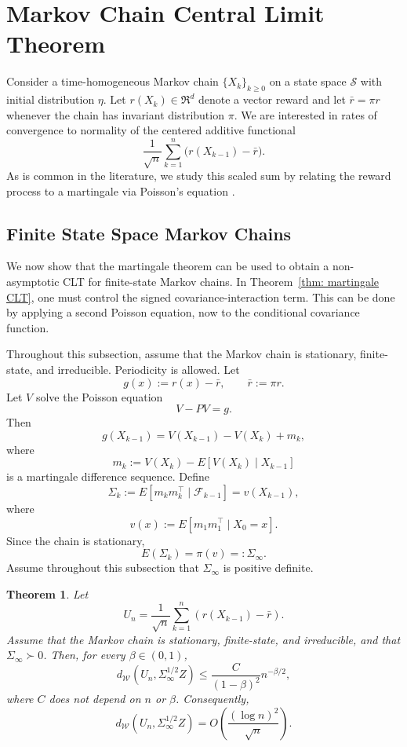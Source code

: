 \documentclass[10pt,a4paper]{article}
\newtheorem{theorem}{Theorem}
\begin{document}
\section{Markov Chain Central Limit Theorem}\label{sec: Markov}
Consider a time-homogeneous Markov chain $\{X_k\}_{k\geq 0}$ on a state space $\mathcal{S}$ with initial distribution $\eta$. Let $r(X_k)\in\Re^d$ denote a vector reward and let $\bar r=\pi r$ whenever the chain has invariant distribution $\pi$. We are interested in rates of convergence to normality of the centered additive functional
\[
    \frac{1}{\sqrt n}\sum_{k=1}^n\bigl(r(X_{k-1})-\bar r\bigr).
\]
As is common in the literature, we study this scaled sum by relating the reward process to a martingale via Poisson's equation \citep{douc2018markov,makowski2002poisson,glynn1996liapounov,glynn2023solution}.

\subsection{Finite State Space Markov Chains}
\label{subsec: finite_state_MC_corrected}

We now show that the martingale theorem can be used to obtain a
non-asymptotic CLT for finite-state Markov chains.  In Theorem~\ref{thm: martingale CLT}, one must control
the signed covariance-interaction term.  This can
be done by applying a second Poisson equation, now to the conditional
covariance function.

Throughout this subsection, assume that the Markov chain is stationary,
finite-state, and irreducible.  Periodicity is allowed.  Let
\[
    g(x):=r(x)-\bar r,
    \qquad
    \bar r:=\pi r.
\]
Let \(V\) solve the Poisson equation
\[
    V-PV=g.
\]
Then
\[
    g(X_{k-1})
    =
    V(X_{k-1})-V(X_k)+m_k,
\]
where
\[
    m_k:=V(X_k)-E[V(X_k)\mid X_{k-1}]
\]
is a martingale difference sequence.  Define
\[
    \Sigma_k:=E[m_km_k^\top\mid \mathcal F_{k-1}]
    =
    v(X_{k-1}),
\]
where
\[
    v(x):=E[m_1m_1^\top\mid X_0=x].
\]
Since the chain is stationary,
\[
    E(\Sigma_k)=\pi(v)=:\Sigma_\infty.
\]
Assume throughout this subsection that \(\Sigma_\infty\) is positive definite.

\begin{theorem}\label{thm: MC CLT}
Let
\[
U_n=\frac1{\sqrt n}\sum_{k=1}^n(r(X_{k-1})-\bar r).
\]
Assume that the Markov chain is stationary, finite-state, and irreducible,
and that $\Sigma_\infty\succ0$. Then, for every $\beta\in(0,1)$,
\[
d_{\mathcal W}(U_n,\Sigma_\infty^{1/2}Z)
\le \frac{C}{(1-\beta)^2}n^{-\beta/2},
\]
where $C$ does not depend on $n$ or $\beta$. Consequently,
\[
d_{\mathcal W}(U_n,\Sigma_\infty^{1/2}Z)
=O\left(\frac{(\log n)^2}{\sqrt n}\right).
\]
\end{theorem}
\end{document}
